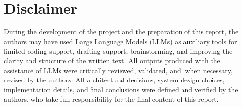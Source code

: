 \section*{Disclaimer}

During the development of the project and the preparation of this report, the authors may have used Large Language Models
(LLMs) as auxiliary tools for limited coding support, drafting support, brainstorming, and improving the clarity and
structure of the written text. All outputs produced with the assistance of LLMs were critically reviewed, validated, and,
when necessary, revised by the authors. All architectural decisions, system design choices, implementation details, and
final conclusions were defined and verified by the authors, who take full responsibility for the final content of this report.
